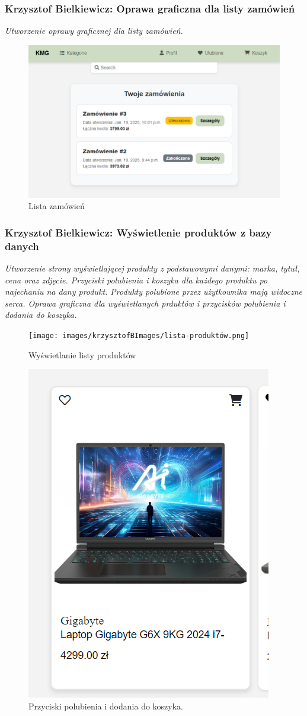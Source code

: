\documentclass[12pt,a4paper,oneside]{article}
\theoremstyle{definition}
\numberwithin{equation}{section}
\begin{document}
\subsubsection{Krzysztof Bielkiewicz: Oprawa graficzna dla listy zamówień}
\label{1.3.12}
\textit{Utworzenie oprawy graficznej dla listy zamówień.}

\begin{figure}[H]
    \centering
    \includegraphics[width=0.8\columnwidth]{images/krzysztofBImages/orders.png}
    \caption{Lista zamówień}
    \label{orders}
\end{figure}


\subsubsection{Krzysztof Bielkiewicz: Wyświetlenie produktów z bazy danych}
\label{1.3.13}
\textit{Utworzenie strony wyświetlającej produkty z podstawowymi danymi: marka, tytuł, cena oraz zdjęcie.
Przyciski polubienia i koszyka dla każdego produktu po najechaniu na dany produkt.
Produkty polubione przez użytkownika mają widoczne serca.
Oprawa graficzna dla wyświetlanych prduktów i przycisków polubienia i dodania do koszyka.}
\begin{figure}[H]
    \centering
    \texttt{[image: images/krzysztofBImages/lista-produktów.png]}
    \caption{Wyświetlanie listy produktów}
    \label{products}
\end{figure}

\begin{figure}[H]
    \centering
    \includegraphics[width=0.5\columnwidth]{images/krzysztofBImages/przyciski-polubienia-koszyka.png}
    \caption{Przyciski polubienia i dodania do koszyka.}
    \label{producs-buttons}
\end{figure}
\end{document}

